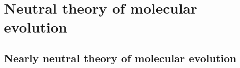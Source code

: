 \documentclass[
]{book}
\begin{document}
\hypertarget{neutral-theory-of-molecular-evolution}{%
\chapter{Neutral theory of molecular evolution}\label{neutral-theory-of-molecular-evolution}}

\hypertarget{nearly-neutral-theory-of-molecular-evolution}{%
\section{Nearly neutral theory of molecular evolution}\label{nearly-neutral-theory-of-molecular-evolution}}

  
\end{document}
